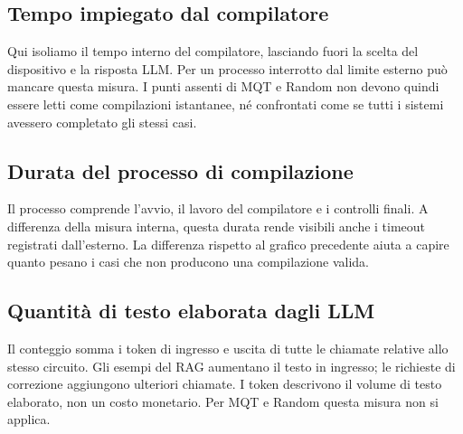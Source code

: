 \subsection{Tempo impiegato dal compilatore}
\begingroup\small Qui isoliamo il tempo interno del compilatore, lasciando fuori la scelta del dispositivo e la risposta LLM. Per un processo interrotto dal limite esterno può mancare questa misura. I punti assenti di MQT e Random non devono quindi essere letti come compilazioni istantanee, né confrontati come se tutti i sistemi avessero completato gli stessi casi.\par\endgroup
\begin{center}

\end{center}\restoregeometry
\clearpage{}\captionsetup{hypcap=false}
\subsection{Durata del processo di compilazione}
\begingroup\small Il processo comprende l’avvio, il lavoro del compilatore e i controlli finali. A differenza della misura interna, questa durata rende visibili anche i timeout registrati dall’esterno. La differenza rispetto al grafico precedente aiuta a capire quanto pesano i casi che non producono una compilazione valida.\par\endgroup
\begin{center}

\end{center}\restoregeometry
\clearpage{}\captionsetup{hypcap=false}
\subsection{Quantità di testo elaborata dagli LLM}
\begingroup\small Il conteggio somma i token di ingresso e uscita di tutte le chiamate relative allo stesso circuito. Gli esempi del RAG aumentano il testo in ingresso; le richieste di correzione aggiungono ulteriori chiamate. I token descrivono il volume di testo elaborato, non un costo monetario. Per MQT e Random questa misura non si applica.\par\endgroup
\begin{center}

\end{center}\restoregeometry
\clearpage{}\captionsetup{hypcap=false}
